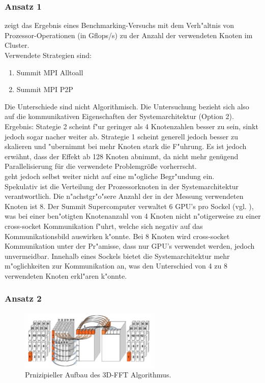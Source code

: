 \subsubsection{Ansatz 1}
\cite[Abbildung 4]{mainpaper} zeigt das Ergebnis eines Benchmarking-Versuchs mit dem Verh"altnis von Prozessor-Operationen (in Gflops/s) zu der Anzahl der verwendeten Knoten im Cluster.\\
Verwendete Strategien sind:
\begin{enumerate}
	\item Summit MPI Alltoall
	\item Summit MPI P2P
\end{enumerate}
Die Unterschiede sind nicht Algorithmisch. Die Untersuchung bezieht sich also auf die kommunikativen Eigenschaften der Systemarchitektur (Option 2).\\
Ergebnis: Stategie 2 scheint f"ur geringer als 4 Knotenzahlen besser zu sein, sinkt jedoch sogar nacher weiter ab.
Strategie 1 scheint generell jedoch besser zu skalieren und "ubernimmt bei mehr Knoten stark die F"uhrung. Es ist jedoch erwähnt, dass der Effekt ab 128 Knoten abnimmt, da nicht mehr genügend Parallelisierung für die verwendete Problemgröße vorherrscht.\\
\cite{mainpaper} geht jedoch selbst weiter nicht auf eine m"ogliche Begr"undung ein.\\
Spekulativ ist die Verteilung der Prozessorknoten in der Systemarchitektur verantwortlich. Die n"achstgr"o"sere Anzahl der in der Messung verwendeten Knoten ist 8. Der Summit Supercomputer verwaltet 6 GPU's pro Sockel (vgl. \cite{summit,osummit}), was bei einer ben"otigten Knotenanzahl von 4 Knoten nicht n"otigerweise zu einer cross-socket Kommunikation f"uhrt, welche sich negativ auf das Kommunikationsbild auswirken k"onnte. Bei 8 Knoten wird cross-socket Kommunikation unter der Pr"amisse, dass nur GPU's verwendet werden, jedoch unvermeidbar. Innehalb eines Sockels bietet die Systemarchitektur mehr m"oglichkeiten zur Kommunikation an, was den Unterschied von 4 zu 8 verwendeten Knoten erkl"aren k"onnte.

\subsubsection{Ansatz 2}
\begin{figure}
\centering
\includegraphics[width=0.6\textwidth]{res/algo.png}
\caption{\cite[Abb. 2]{mainpaper} Prnizipieller Aufbau des 3D-FFT Algorithmus. }
	\label{fig:algo}
\end{figure}

